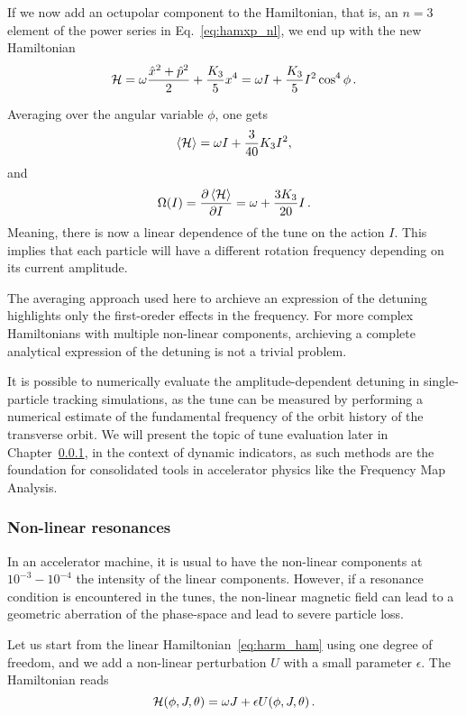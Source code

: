 If we now add an octupolar component to the Hamiltonian, that is, an $n=3$ element of the power series in Eq.~\ref{eq:hamxp_nl}, we end up with the new Hamiltonian
\begin{equation}
	\mathcal{H} = \omega \frac{\hat x^2 + \hat p^2}{2} + \frac{K_3}{5} x^4 = \omega I + \frac{K_3}{5} I^2 \cos^4\phi\, .
\end{equation}

Averaging over the angular variable $\phi$, one gets
\begin{equation}
	\left<{\mathcal{H}}\right> = \omega I + \frac{3}{40}K_3 I^2,
\end{equation}
%
and
%
\begin{equation}
	\Omega(I) = \pdv{\left<{\mathcal{H}}\right>}{I} = \omega + \frac{3K_3}{20} I\,.
\end{equation}
Meaning, there is now a linear dependence of the tune on the action $I$. This implies that each particle will have a different rotation frequency depending on its current amplitude.

The averaging approach used here to archieve an expression of the detuning highlights only the first-oreder effects in the frequency. For more complex Hamiltonians with multiple non-linear components, archieving a complete analytical expression of the detuning is not a trivial problem.

It is possible to numerically evaluate the amplitude-dependent detuning in single-particle tracking simulations, as the tune can be measured by performing a numerical estimate of the fundamental frequency of the orbit history of the transverse orbit. We will present the topic of tune evaluation later in Chapter~\ref{}, in the context of dynamic indicators, as such methods are the foundation for consolidated tools in accelerator physics like the Frequency Map Analysis.

\subsubsection{Non-linear resonances}

In an accelerator machine, it is usual to have the non-linear components at $10^{-3} - 10^{-4}$ the intensity of the linear components. However, if a resonance condition is encountered in the tunes, the non-linear magnetic field can lead to a geometric aberration of the phase-space and lead to severe particle loss.

Let us start from the linear Hamiltonian~\eqref{eq:harm_ham} using one degree of freedom, and we add a non-linear perturbation $U$ with a small parameter $\epsilon$. The Hamiltonian reads
%
\begin{equation}
	\mathcal{H}(\phi, J, \theta) = \omega J + \epsilon U(\phi, J, \theta)\,.
\end{equation}

